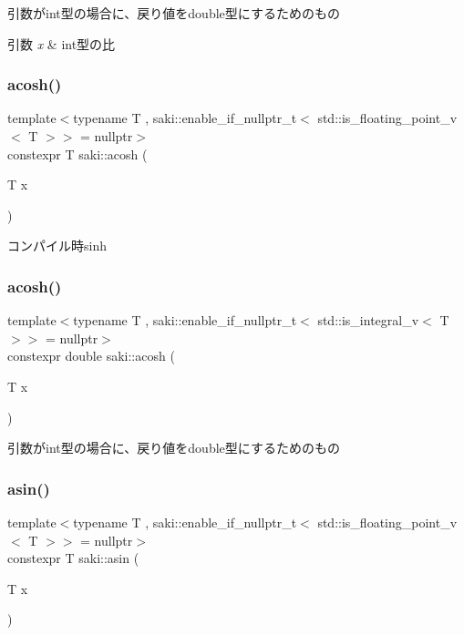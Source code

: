 引数がint型の場合に、戻り値をdouble型にするためのもの 


\begin{DoxyParams}{引数}
{\em x} & int型の比 \\
\hline
\end{DoxyParams}
\mbox{\label{namespacesaki_ac1c85a4defc25dc9eb6b380f29946f83}} 
\subsubsection{\texorpdfstring{acosh()}{acosh()}\hspace{0.1cm}{\footnotesize\ttfamily [1/2]}}
{\footnotesize\ttfamily template$<$typename T , saki\+::enable\+\_\+if\+\_\+nullptr\+\_\+t$<$ std\+::is\+\_\+floating\+\_\+point\+\_\+v$<$ T $>$$>$  = nullptr$>$ \\
constexpr T saki\+::acosh (\begin{DoxyParamCaption}\item[{T}]{x }\end{DoxyParamCaption})}



コンパイル時sinh 

\mbox{\label{namespacesaki_a8d3766d425082661e966b04504b90002}} 
\subsubsection{\texorpdfstring{acosh()}{acosh()}\hspace{0.1cm}{\footnotesize\ttfamily [2/2]}}
{\footnotesize\ttfamily template$<$typename T , saki\+::enable\+\_\+if\+\_\+nullptr\+\_\+t$<$ std\+::is\+\_\+integral\+\_\+v$<$ T $>$$>$  = nullptr$>$ \\
constexpr double saki\+::acosh (\begin{DoxyParamCaption}\item[{T}]{x }\end{DoxyParamCaption})}



引数がint型の場合に、戻り値をdouble型にするためのもの 

\mbox{\label{namespacesaki_a63f2b40515cd62b037dade64aa8465db}} 
\subsubsection{\texorpdfstring{asin()}{asin()}\hspace{0.1cm}{\footnotesize\ttfamily [1/2]}}
{\footnotesize\ttfamily template$<$typename T , saki\+::enable\+\_\+if\+\_\+nullptr\+\_\+t$<$ std\+::is\+\_\+floating\+\_\+point\+\_\+v$<$ T $>$$>$  = nullptr$>$ \\
constexpr T saki\+::asin (\begin{DoxyParamCaption}\item[{T}]{x }\end{DoxyParamCaption})}



